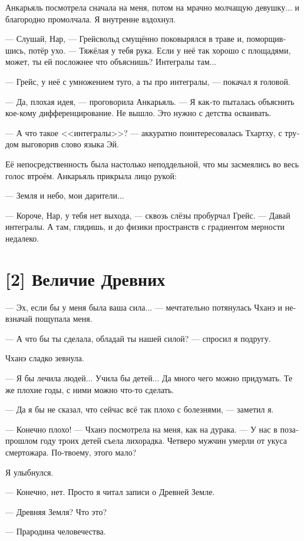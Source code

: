 \documentclass[a4paper,12pt,fleqn]{book}\usepackage{polyglossia}\setdefaultlanguage[babelshorthands=true]{russian}\setotherlanguage{english}\defaultfontfeatures{Ligatures=TeX,Mapping=tex-text}\usepackage{xcolor}\newcommand{\ml}[3]{#2}
\begin{document}
{Анкарьяль посмотрела сначала на меня, потом на мрачно молчащую девушку... и благородно промолчала.
Я внутренне вздохнул.

--- Слушай, Нар, --- Грейсвольд смущённо поковырялся в траве и, поморщившись, потёр ухо.
--- Тяжёлая у тебя рука.
Если у неё так хорошо с площадями, может, ты ей посложнее что объяснишь?
Интегралы там...

--- Грейс, у неё с умножением туго, а ты про интегралы, --- покачал я головой.

--- Да, плохая идея, --- проговорила Анкарьяль.
--- Я как-то пыталась объяснить кое-кому дифференцирование.
Не вышло.
Это нужно с детства осваивать.

--- А что такое <<интегралы>>? --- аккуратно поинтересовалась Тхартху, с трудом выговорив слово языка Эй.

Её непосредственность была настолько неподдельной, что мы засмеялись во весь голос втроём.
Анкарьяль прикрыла лицо рукой:

--- Земля и небо, мои дарители...

--- Короче, Нар, у тебя нет выхода, --- сквозь слёзы пробурчал Грейс.
--- Давай интегралы.
А там, глядишь, и до физики пространств с градиентом мерности недалеко.

\section{[2] Величие Древних}

--- Эх, если бы у меня была ваша сила... --- мечтательно потянулась Чханэ и невзначай пощупала меня.

--- А что бы ты сделала, обладай ты нашей силой? --- спросил я подругу.

Чханэ сладко зевнула.

--- Я бы лечила людей... Учила бы детей... Да много чего можно придумать.
Те же плохие годы, с ними можно что-то сделать.

--- Да я бы не сказал, что сейчас всё так плохо с болезнями, --- заметил я.

--- Конечно плохо! --- Чханэ посмотрела на меня, как на дурака.
--- У нас в позапрошлом году троих детей съела лихорадка.
Четверо мужчин умерли от укуса смертожара.
По-твоему, этого мало?

Я улыбнулся.

--- Конечно, нет.
Просто я читал записи о Древней Земле.

--- Древняя Земля?
Что это?

--- Прародина человечества.

}
\end{document}
